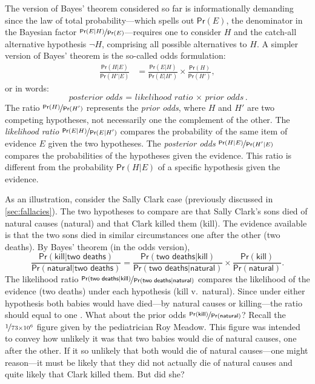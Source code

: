 \documentclass{article}
\newcommand{\pr}{\mathsf{Pr}}
\begin{document}
The version of Bayes' theorem considered so far is informationally demanding since 
the law of total probability---which spells out $\pr(E)$, the denominator in the Bayesian factor $\nicefrac{\pr(E \vert H)}{\pr(E)}$---requires one to consider $H$ and the catch-all alternative hypothesis $\neg H$, comprising all possible alternatives to $H$.  %
A simpler version of Bayes' theorem is 
 the so-called odds 
formulation: 
\begin{align*}\frac{\pr(H \vert E)} {\pr(H' \vert E)}& = \frac{\pr(E \vert H)}{\pr(E \vert H')} \times \frac{\pr(H)} {\pr(H')}, \end{align*}
or in words:
\[\textit{posterior odds = likelihood ratio $\times$ prior odds}. \]
The ratio $\nicefrac{\pr(H)}{\pr(H')}$ represents the \textit{prior odds}, where $H$ and $H'$ are two competing hypotheses, not necessarily one the complement of the other.  
The \textit{likelihood ratio} $\nicefrac{\pr(E \vert H)}{\pr(E \vert H')}$ 
compares the probability of the same item of evidence $E$ given the two 
hypotheses. 
The \textit{posterior odds} $\nicefrac{\pr(H \vert E)}{\pr(H' \vert E)}$ compares the probabilities of the  hypotheses given the evidence. This ratio is different from the probability $\pr(H \vert E)$ of a specific hypothesis given the evidence.


As an illustration, consider the Sally Clark case (previously discussed in \ref{sec:fallacies}). 
The two hypotheses to compare are that Sally Clark's sons 
died of natural causes (\textsf{natural}) and that  Clark killed them (\textsf{kill}). The evidence available is that 
the two sons died in similar circumstances one after the other (\textsf{two deaths}).
By Bayes' theorem (in the odds version),
\[
 \frac{\pr(\textsf{kill} \vert \textsf{two deaths})}{\pr(\textsf{natural} \vert \textsf{two deaths})} = 
 \frac{\pr(\textsf{two deaths} \vert \textsf{kill})}{\pr(\textsf{two deaths} \vert \textsf{natural})} 
 \times 
 \frac{\pr(\textsf{kill})}{\pr(\textsf{natural})}.
\]
The likelihood ratio $ \nicefrac{\pr(\textsf{two deaths} \vert \textsf{kill})}{\pr(\textsf{two deaths} \vert \textsf{natural})}$ 
compares the likelihood of the evidence (\textsf{two deaths}) under each hypothesis (\textsf{kill} v.\ \textsf{natural}). 
Since under either hypothesis both babies would have died---by 
natural causes or killing---the ratio should equal to one \citep{Dawid02}. %
What about 
the prior odds $\nicefrac{\pr(\textsf{kill})}{\pr(\textsf{natural})}$? 
Recall the $\nicefrac{1}{73\times 10^6}$ figure given by the pediatrician Roy Meadow. This figure was intended to convey how unlikely it was that two babies would die of natural causes, one after the other. If it so unlikely that both would die of natural causes---one might reason---it must be likely that they did not actually die of natural causes and 
quite likely that Clark killed them. But did she? 
\end{document}
